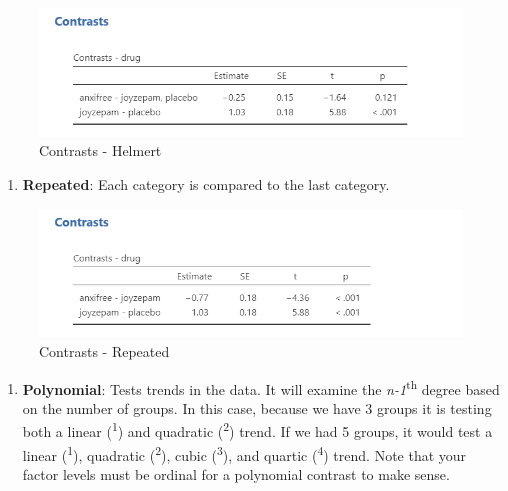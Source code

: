 \documentclass[
]{book}
\providecommand{\tightlist}{%
  \setlength{\itemsep}{0pt}\setlength{\parskip}{0pt}}
\begin{document}
\begin{figure}

{\centering \includegraphics[width=1\linewidth]{images/04_one-way-anova/contrasts_helmert} 

}

\caption{Contrasts - Helmert}\label{fig:unnamed-chunk-12}
\end{figure}

\begin{enumerate}
\def\labelenumi{\arabic{enumi}.}
\setcounter{enumi}{4}
\tightlist
\item
  \textbf{Repeated}: Each category is compared to the last category.
\end{enumerate}

\begin{figure}

{\centering \includegraphics[width=1\linewidth]{images/04_one-way-anova/contrasts_repeated} 

}

\caption{Contrasts - Repeated}\label{fig:unnamed-chunk-13}
\end{figure}

\begin{enumerate}
\def\labelenumi{\arabic{enumi}.}
\setcounter{enumi}{5}
\tightlist
\item
  \textbf{Polynomial}: Tests trends in the data. It will examine the \emph{n-1}\textsuperscript{th} degree based on the number of groups. In this case, because we have 3 groups it is testing both a linear (\textsuperscript{1}) and quadratic (\textsuperscript{2}) trend. If we had 5 groups, it would test a linear (\textsuperscript{1}), quadratic (\textsuperscript{2}), cubic (\textsuperscript{3}), and quartic (\textsuperscript{4}) trend. Note that your factor levels must be ordinal for a polynomial contrast to make sense.
\end{enumerate}
\end{document}
